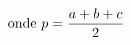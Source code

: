 \documentclass[preview]{standalone}
\begin{document}
\begin{align*}
\special{dvisvgm:raw <g id='unique000'>}\text{onde } p = \frac{a+b+c}{2}\special{dvisvgm:raw </g>}
\end{align*}
\end{document}
